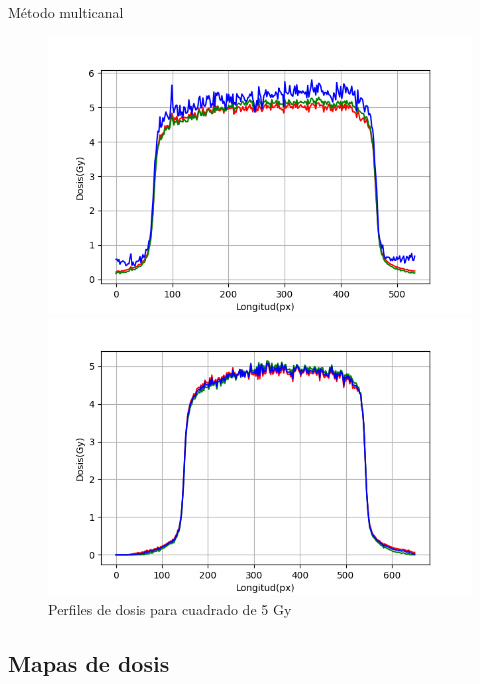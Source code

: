 \documentclass[12pt]{beamer}
\begin{document}
\begin{frame}{Método multicanal}
\begin{figure}[htp]%
	\centering
	\begin{minipage}{0.6\textwidth}
		\includegraphics[width=\textwidth]{images/perfilDosisCuadradoUnoSolo.png}
	\end{minipage}\hfill
	\begin{minipage}{0.6\textwidth}
		\includegraphics[width=\textwidth]{images/perfilDosisCuadradoMulticanal.png}
	\end{minipage}
	\caption{Perfiles de dosis para cuadrado de 5 Gy}
\end{figure}
\end{frame}

\subsection{Mapas de dosis}
\end{document}
